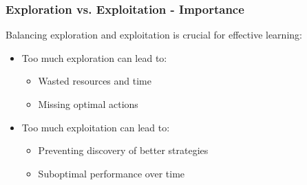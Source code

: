 \documentclass[aspectratio=169]{beamer}
\begin{document}
\begin{frame}[fragile]
    \frametitle{Exploration vs. Exploitation - Importance}
    Balancing exploration and exploitation is crucial for effective learning:
    
    \begin{itemize}
        \item Too much exploration can lead to:
            \begin{itemize}
                \item Wasted resources and time
                \item Missing optimal actions
            \end{itemize}
        \item Too much exploitation can lead to:
            \begin{itemize}
                \item Preventing discovery of better strategies
                \item Suboptimal performance over time
            \end{itemize}
    \end{itemize}
\end{frame}
\end{document}
